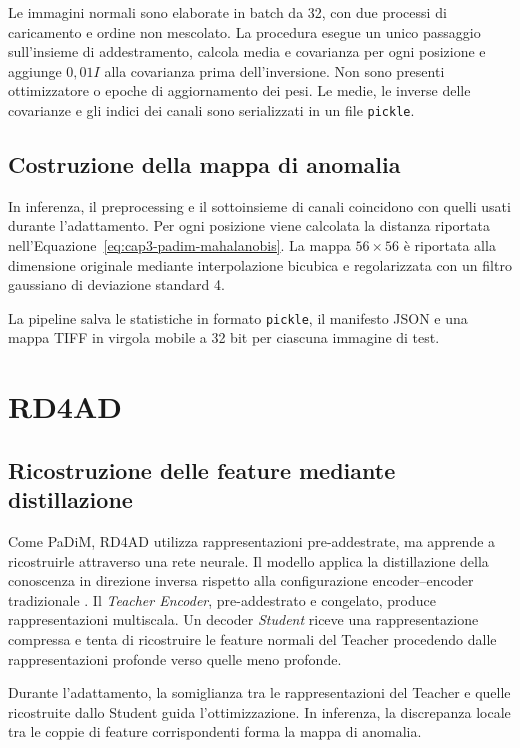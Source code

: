 Le immagini normali sono elaborate in batch da 32, con due processi di caricamento e ordine non mescolato. La procedura esegue un unico passaggio sull'insieme di addestramento, calcola media e covarianza per ogni posizione e aggiunge $0{,}01I$ alla covarianza prima dell'inversione. Non sono presenti ottimizzatore o epoche di aggiornamento dei pesi. Le medie, le inverse delle covarianze e gli indici dei canali sono serializzati in un file \texttt{pickle}.

\subsection{Costruzione della mappa di anomalia}

In inferenza, il preprocessing e il sottoinsieme di canali coincidono con quelli usati durante l'adattamento. Per ogni posizione viene calcolata la distanza riportata nell'Equazione~\ref{eq:cap3-padim-mahalanobis}. La mappa $56\times56$ è riportata alla dimensione originale mediante interpolazione bicubica e regolarizzata con un filtro gaussiano di deviazione standard 4.

La pipeline salva le statistiche in formato \texttt{pickle}, il manifesto JSON e una mappa TIFF in virgola mobile a 32 bit per ciascuna immagine di test.

\section{RD4AD}
\label{sec:cap3-rd4ad}

\subsection{Ricostruzione delle feature mediante distillazione}

Come PaDiM, RD4AD utilizza rappresentazioni pre-addestrate, ma apprende a ricostruirle attraverso una rete neurale. Il modello applica la distillazione della conoscenza in direzione inversa rispetto alla configurazione encoder--encoder tradizionale \cite{Deng_et_al._2022}. Il \textit{Teacher Encoder}, pre-addestrato e congelato, produce rappresentazioni multiscala. Un decoder \textit{Student} riceve una rappresentazione compressa e tenta di ricostruire le feature normali del Teacher procedendo dalle rappresentazioni profonde verso quelle meno profonde.

Durante l'adattamento, la somiglianza tra le rappresentazioni del Teacher e quelle ricostruite dallo Student guida l'ottimizzazione. In inferenza, la discrepanza locale tra le coppie di feature corrispondenti forma la mappa di anomalia.

